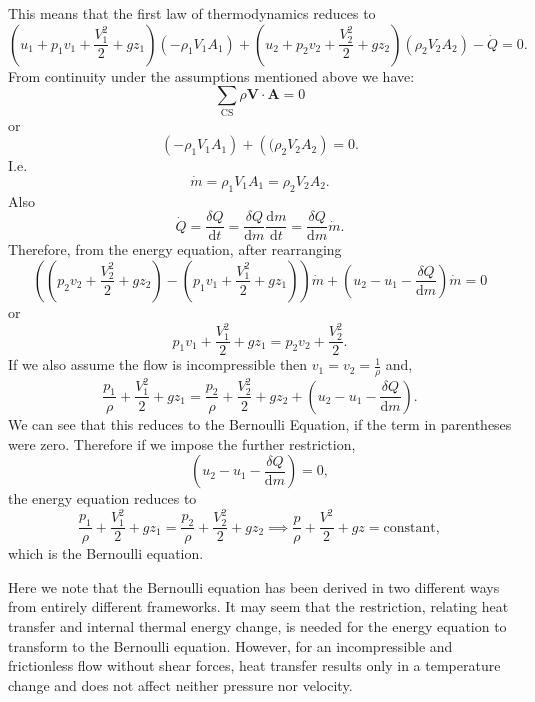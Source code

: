This means that the first law of thermodynamics reduces to
\[ 
\left( u_1 + p_1 v_1 + \frac{V_1^2}{2} + gz_1 \right) \left( - \rho_1 V_1 A_1 \right) + \left( u_2 + p_2 v_2 + \frac{V_2^2}{2} + gz_2 \right) \left( \rho_2 V_2 A_2 \right) - \dot{Q} = 0
.\]
From continuity under the assumptions mentioned above we have:
\[ 
\sum_{\mathrm{CS}} \rho \textbf{V} \cdot \textbf{A} = 0
\]
or
\[ 
\left( - \rho_1 V_1 A_1 \right) + \left( (\rho_2 V_2 A_2 \right) = 0
.\]
I.e.
\[ 
\dot{m} = \rho_1 V_1 A_1 = \rho_2 V_2 A_2
.\]
Also
\[ 
\dot{Q} = \frac{\delta Q}{\mathrm{d}t} = \frac{\delta Q}{\mathrm{d}m} \frac{\mathrm{d}m}{\mathrm{d}t} = \frac{\delta Q}{\mathrm{d}m} \dot{m}
.\]
Therefore, from the energy equation, after rearranging
\[ 
\left( \left( p_2 v_2 + \frac{V_{2}^2}{2} + gz_2 \right) - \left( p_1 v_1 + \frac{V_1^2}{2} + gz_1 \right) \right) \dot{m} + \left( u_2 - u_1 - \frac{\delta Q}{\mathrm{d}m} \right) \dot{m} = 0
\]
or
\[ 
p_1 v_1 + \frac{V_1^2}{2} + gz_1 = p_2 v_2 + \frac{V_2^2}{2}
.\]
If we also assume the flow is incompressible then $v_1 = v_2 = \frac{1}{\rho}$ and,
\[ 
\frac{p_1}{\rho} + \frac{V_1^2}{2} + gz_1 = \frac{p_2}{\rho} + \frac{V_2^2}{2} + gz_2 + \left( u_2 - u_1 - \frac{\delta Q}{\mathrm{d}m} \right)
.\]
We can see that this reduces to the Bernoulli Equation,  if the term in parentheses were zero. Therefore if we impose the further restriction,
\[ 
\left( u_2 - u_1 - \frac{\delta Q}{\mathrm{d}m} \right) = 0
,\]
the energy equation reduces to
\[ 
  \frac{p_1}{\rho} + \frac{V_1^2}{2} + gz_1 = \frac{p_2}{\rho} + \frac{V_2^2}{2}+ gz_2 \implies \frac{p}{\rho} + \frac{V^2}{2} + gz = \mathrm{constant}
,\]
which is the Bernoulli equation. 

Here we note that the Bernoulli equation has been derived in two different ways from entirely different frameworks. It may seem that the restriction, relating heat transfer and internal thermal energy change, is needed for the energy equation to transform to the Bernoulli equation.  However, for an incompressible and frictionless flow without shear forces, heat transfer results only in a temperature change and does not affect neither pressure nor velocity. 

